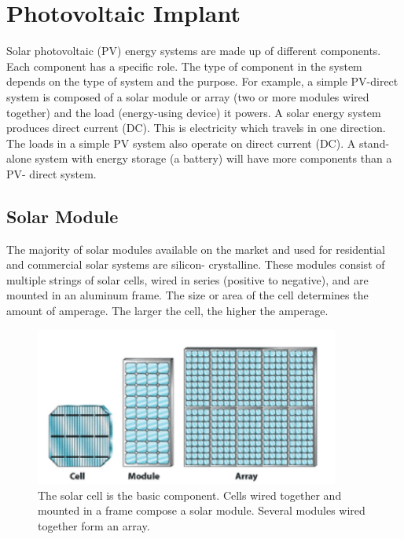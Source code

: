 \section{Photovoltaic Implant}\label{sec:pv}

Solar photovoltaic (PV) energy systems are made up of
different components. Each component has a specific role.
The type of component in the system depends on the type
of system and the purpose. For example, a simple PV-direct
system is composed of a solar module or array (two or more
modules wired together) and the load (energy-using device)
it powers. A solar energy system produces
direct current (DC)\cite{pvarizona}. This is electricity which travels in one
direction. The loads in a simple PV system also operate
on direct current (DC). A stand-alone system with energy
storage (a battery) will have more components than a PV-
direct system.

\subsection{Solar Module}
The majority of solar modules available on the market and
used for residential and commercial solar systems are silicon-
crystalline\cite{pvarizona}. These modules consist of multiple strings of solar
cells, wired in series (positive to negative), and are mounted
in an aluminum frame. The size or area of
the cell determines the amount of amperage. The larger the
cell, the higher the amperage\cite{pvarizona}.

\begin{figure}[H]
	\centering
	\includegraphics[width=10cm, keepaspectratio]{chapters/1_introduction/imgs/solarmodule.png}
	\caption{The solar cell is the basic component. Cells wired together
		and mounted in a frame compose a solar module. Several modules
		wired together form an array\cite{pvarizona}.}
	\label{fig:solmodule}
\end{figure}

